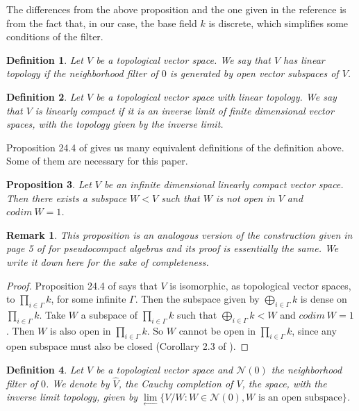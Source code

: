 \documentclass[a4paper,12pt]{article}
\newtheorem{prop}{Proposition}[section]
\newtheorem{obs}{Remark}[section]
\newtheorem{defi}[prop]{Definition}
\theoremstyle{bloco}
\begin{document}
The differences from the above proposition and the one given in the reference is from the fact that, in our case, the base field $k$ is discrete, which simplifies some conditions of the filter.

\begin{defi}Let $V$ be a topological vector space. We say that $V$ has linear topology if the neighborhood filter of $0$ is generated by open vector subspaces of $V$.
\end{defi}

\begin{defi}Let $V$ be a topological vector space with linear topology. We say that $V$ is linearly compact if it is an inverse limit of finite dimensional vector spaces, with the topology given by the inverse limit.
\end{defi}

Proposition 24.4 of \cite{BeH} gives us many equivalent definitions of the definition above. Some of them are necessary for this paper.  

\begin{prop}\label{linearcompacthasdense} Let $V$ be an infinite dimensional linearly compact vector space. Then there exists a subspace $W < V$ such that $W$ is not open in $V$ and $codim \ W = 1$.
\end{prop}

\begin{obs}This proposition is an analogous version of the construction given in page 5 of \cite{IM} for pseudocompact algebras and its proof is essentially the same. We write it down here for the sake of completeness.
\end{obs}

\begin{proof}Proposition 24.4 of \cite{BeH} says that $V$ is isomorphic, as topological vector spaces, to $\prod_{i \in \Gamma} k$, for some infinite $\Gamma$. Then the subspace given by $\bigoplus_{i \in \Gamma} k$ is dense on $\prod_{i \in \Gamma} k$. Take $W$ a subspace of $\prod_{i \in \Gamma} k$ such that $\bigoplus_{i \in \Gamma} k < W$ and $codim \ W = 1$ . Then $W$ is also open in $\prod_{i \in \Gamma} k$. So $W$ cannot be open in $\prod_{i \in \Gamma} k$, since any open subspace must also be closed (Corollary 2.3 of \cite{Wa}).
\end{proof}

\begin{defi}Let $V$ be a topological vector space and $\mathcal{N}(0)$ the neighborhood filter of $0$. We denote by $\hat{V}$, the Cauchy completion of $V$, the space, with the inverse limit topology, given by $\lim\limits_{\longleftarrow} \{V/W: W \in \mathcal{N}(0), W \text{ is an open subspace}\}$.
\end{defi}
\end{document}
